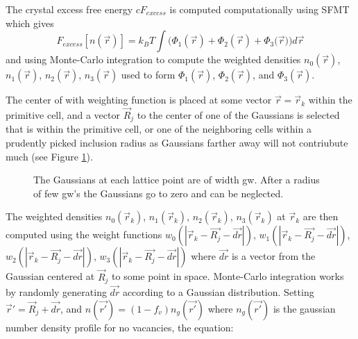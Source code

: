 \documentclass[double,12pt]{beavtex}
\begin{document}
The crystal excess free energy $cF_{excess}$ is computed computationally using SFMT which gives
\begin{displaymath}{F_{excess}[n(\vec{r})]= k_BT\int(\Phi_1(\vec{r})+\Phi_2(\vec{r})+\Phi_3(\vec{r}{)) d}\vec{r}}\end{displaymath} and using Monte-Carlo integration to compute the weighted densities $n_0(\vec{r})$, $n_1(\vec{r})$, $n_2(\vec{r})$, $n_3(\vec{r})$ used to form $\Phi_1(\vec{r})$, $\Phi_2(\vec{r})$, and $\Phi_3(\vec{r})$.

The center of with weighting function is placed at some vector $\vec{r}=\vec{r}_k$ within the primitive cell, and a vector $\vec{R}_j$ to the center of one of the Gaussians is selected that is within the primitive cell, or one of the neighboring cells within a prudently picked inclusion radius as Gaussians farther away will not contriubute much (see Figure \ref{fig:InclusionRadius}).

 \begin{figure}[h!]
    \centering
    \caption{The Gaussians at each lattice point are of width gw. After a radius of few gw's the Gaussians go to zero and can be neglected.}
    \label{fig:InclusionRadius}
  \end{figure} 



The weighted densities $n_0(\vec{r}_k)$, $n_1(\vec{r}_k)$, $n_2(\vec{r}_k)$, $n_3(\vec{r}_k)$ at $\vec{r}_k$ are then computed using the weight functions $w_0(|\vec{r}_k-\vec{R_j}-\vec{dr}|)$, $w_1(|\vec{r}_k-\vec{R_j}-\vec{dr}|)$, $w_2(|\vec{r}_k-\vec{R_j}-\vec{dr}|)$, $w_3(|\vec{r}_k-\vec{R_j}-\vec{dr}|)$ where $\vec{dr}$ is a vector from the Gaussian centered at $\vec{R}_j$ to some point in space. Monte-Carlo integration works by randomly generating $\vec{dr}$ according to a Gaussian distribution. Setting $\vec{r}'=\vec{R}_j + \vec{dr}$, and $n(\vec{r'})=(1-f_v)n_g(\vec{r'})$ where $n_g(\vec{r'})$ is the gaussian number density profile for no vacancies, the equation:
\end{document}

